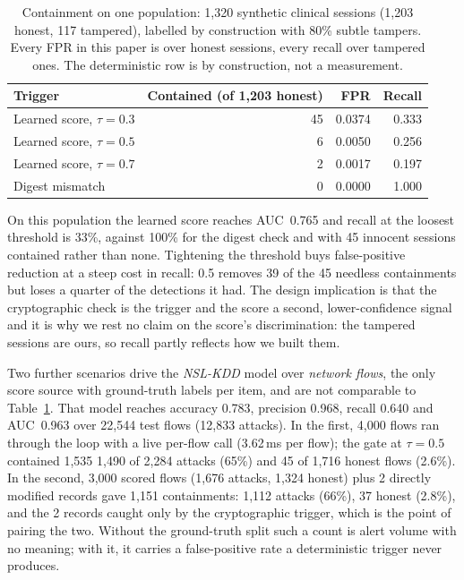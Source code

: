\documentclass[conference]{IEEEtran}
\begin{document}
\begin{table}[t]
\caption{Containment on one population: 1{,}320 synthetic clinical sessions (1{,}203
honest, 117 tampered), labelled by construction with 80\% subtle tampers. Every FPR in
this paper is over honest sessions, every recall over tampered ones. The deterministic
row is by construction, not a measurement.}
\label{tab:gating}
\centering
\scriptsize
\begin{tabular}{lrrr}
\toprule
Trigger & Contained (of 1{,}203 honest) & FPR & Recall \\
\midrule
Learned score, $\tau=0.3$ & 45 & 0.0374 & 0.333 \\
Learned score, $\tau=0.5$ & 6 & 0.0050 & 0.256 \\
Learned score, $\tau=0.7$ & 2 & 0.0017 & 0.197 \\
Digest mismatch & 0 & 0.0000 & 1.000 \\
\bottomrule
\end{tabular}
\end{table}

On this population the learned score reaches AUC~0.765 and recall at the loosest threshold is 33\%,
against 100\% for the digest check and with 45 innocent sessions contained rather than none. Tightening the
threshold buys false-positive reduction at a steep cost in recall: 0.5 removes 39 of the 45 needless
containments but loses a quarter of the detections it had. The design implication is that the cryptographic
check is the trigger and the score a second, lower-confidence signal and it is why we rest no claim on the
score's discrimination: the tampered sessions are ours, so recall partly reflects how we built them.

Two further scenarios drive the \emph{NSL-KDD} model over \emph{network flows}, the only score source with ground-truth labels per item, and are not comparable to Table~\ref{tab:gating}. That model reaches accuracy 0.783, precision 0.968, recall 0.640 and AUC~0.963 over 22{,}544 test flows (12{,}833 attacks). In the first, 4{,}000 flows ran through the loop with a live per-flow call (3.62\,ms per flow); the gate at $\tau=0.5$ contained 1{,}535 1{,}490 of 2{,}284 attacks (65\%) and 45 of 1{,}716 honest flows (2.6\%). In the second, 3{,}000 scored flows (1{,}676 attacks, 1{,}324 honest) plus 2 directly modified records gave 1{,}151 containments: 1{,}112 attacks (66\%), 37 honest (2.8\%), and the 2 records caught only by the cryptographic trigger, which is the point of pairing the two. Without the ground-truth split such a count is alert volume with no meaning; with it, it carries a false-positive rate a deterministic trigger never produces.
\end{document}
